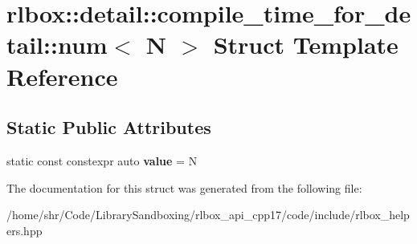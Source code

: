 \hypertarget{structrlbox_1_1detail_1_1compile__time__for__detail_1_1num}{}\section{rlbox\+:\+:detail\+:\+:compile\+\_\+time\+\_\+for\+\_\+detail\+:\+:num$<$ N $>$ Struct Template Reference}
\label{structrlbox_1_1detail_1_1compile__time__for__detail_1_1num}
\subsection*{Static Public Attributes}
\begin{DoxyCompactItemize}
\item 
\mbox{\label{structrlbox_1_1detail_1_1compile__time__for__detail_1_1num_a3ebecc6d20c6b147ad13c12b152999a7}} 
static const constexpr auto {\bfseries value} = N
\end{DoxyCompactItemize}


The documentation for this struct was generated from the following file\+:\begin{DoxyCompactItemize}
\item 
/home/shr/\+Code/\+Library\+Sandboxing/rlbox\+\_\+api\+\_\+cpp17/code/include/rlbox\+\_\+helpers.\+hpp\end{DoxyCompactItemize}
